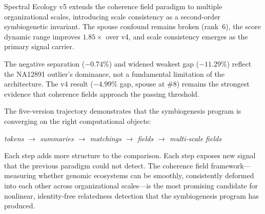 \documentclass{../yalumba}
\begin{document}
Spectral Ecology v5 extends the coherence field paradigm to multiple
organizational scales, introducing scale consistency as a second-order
symbiogenetic invariant.  The spouse confound remains broken (rank~6),
the score dynamic range improves $1.85\times$ over v4, and scale consistency
emerges as the primary signal carrier.


The negative separation ($-0.74\%$) and widened weakest gap ($-11.29\%$)
reflect the NA12891 outlier's dominance, not a fundamental limitation of
the architecture.  The v4 result ($-4.99\%$ gap, spouse at \#8) remains the
strongest evidence that coherence fields approach the passing threshold.

The five-version trajectory demonstrates that the symbiogenesis program is
converging on the right computational objects:

\begin{center}
\emph{tokens $\to$ summaries $\to$ matchings $\to$ fields $\to$ multi-scale fields}
\end{center}

Each step adds more structure to the comparison.  Each step exposes new
signal that the previous paradigm could not detect.  The coherence field
framework---measuring whether genomic ecosystems can be smoothly,
consistently deformed into each other across organizational scales---is
the most promising candidate for nonlinear, identity-free relatedness
detection that the symbiogenesis program has produced.




\end{document}
